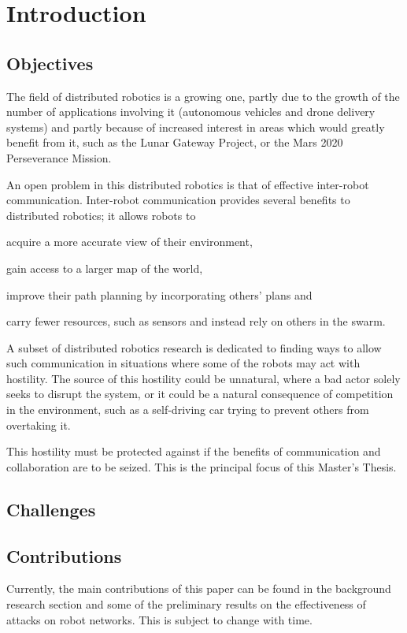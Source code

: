 \chapter{Introduction}
\section{Objectives}

The field of distributed robotics is a growing one, partly due to the growth of the number of applications involving it (autonomous vehicles and drone delivery systems) and partly because of increased interest in areas which would greatly benefit from it, such as the Lunar Gateway Project, or the Mars 2020 Perseverance Mission.

An open problem in this distributed robotics is that of effective inter-robot communication. Inter-robot communication provides several benefits to distributed robotics; it allows robots to
\begin{enumerate*}
    \item acquire a more accurate view of their environment,
    \item gain access to a larger map of the world,
    \item improve their path planning by incorporating others' plans and
    \item carry fewer resources, such as sensors and instead rely on others in the swarm.
\end{enumerate*}

A subset of distributed robotics research is dedicated to finding ways to allow such communication in situations where some of the robots may act with hostility. The source of this hostility could be unnatural, where a bad actor solely seeks to disrupt the system, or it could be a natural consequence of competition in the environment, such as a self-driving car trying to prevent others from overtaking it. 

This hostility must be protected against if the benefits of communication and collaboration are to be seized. This is the principal focus of this Master's Thesis.


\section{Challenges}
\section{Contributions}
Currently, the main contributions of this paper can be found in the background research section and some of the preliminary results on the effectiveness of attacks on robot networks. This is subject to change with time.